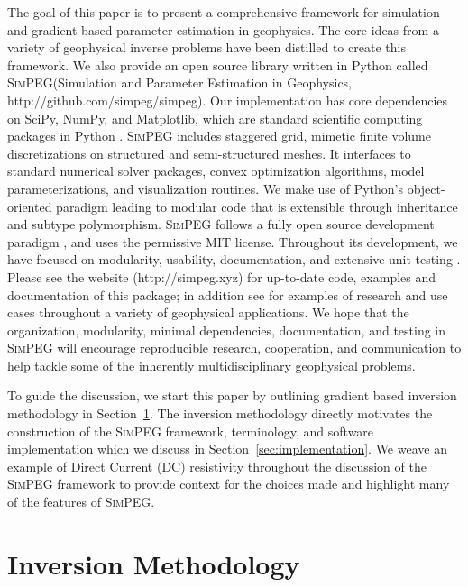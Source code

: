 \documentclass[preprint,review,3p,times,onecolumn,authoryear]{elsarticle}
\newcommand{\SimPEG}{\textsc{SimPEG}\xspace}
\begin{document}
The goal of this paper is to present a comprehensive framework for simulation and gradient based parameter estimation in geophysics. The core ideas from a variety of geophysical inverse problems have been distilled to create this framework. We also provide an open source library written in Python called \SimPEG (Simulation and Parameter Estimation in Geophysics, http://github.com/simpeg/simpeg). Our implementation has core dependencies on SciPy, NumPy, and Matplotlib, which are standard scientific computing packages in Python \citep{scipy, python, scipyOliphant, Hunter:2007}. \SimPEG includes staggered grid, mimetic finite volume discretizations on structured and semi-structured meshes. It interfaces to standard numerical solver packages, convex optimization algorithms, model parameterizations, and visualization routines. We make use of Python's object-oriented paradigm leading to modular code that is extensible through inheritance and subtype polymorphism. \SimPEG follows a fully open source development paradigm \citep{Feller2000}, and uses the permissive MIT license. Throughout its development, we have focused on modularity, usability, documentation, and extensive unit-testing \citep{Wilson2014, RTFD, Travis, Coveralls}. Please see the website (http://simpeg.xyz) for up-to-date code, examples and documentation of this package; in addition see \cite{Kang2014, KangSEG2015, Kang2015, Kang2015a, HeagySEG2014, HeagySEG2015} for examples of research and use cases throughout a variety of geophysical applications. We hope that the organization, modularity, minimal dependencies, documentation, and testing in \SimPEG will encourage reproducible research, cooperation, and communication to help tackle some of the inherently multidisciplinary geophysical problems.

\bigskip

To guide the discussion, we start this paper by outlining gradient based inversion methodology in Section~\ref{sec:methodology}. The inversion methodology directly motivates the construction of the \SimPEG framework, terminology, and software implementation which we discuss in Section~\ref{sec:implementation}. We weave an example of Direct Current (DC) resistivity throughout the discussion of the \SimPEG framework to provide context for the choices made and highlight many of the features of \SimPEG.


\section{Inversion Methodology}
\label{sec:methodology}
\end{document}
